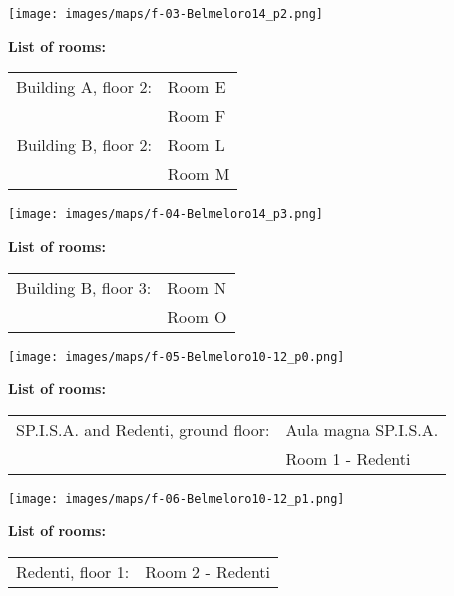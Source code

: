 \newpage
\hspace*{-1cm}
\texttt{[image: images/maps/f-03-Belmeloro14\_p2.png]}
\vfill

{\large\textbf{\hfill List of rooms:}\bigskip}

\hfill\colorbox{siamblue!50}{\large
\begin{tabular}{ r l }
  Building A, floor 2: & Room E \\
                       & Room F \\
  Building B, floor 2: & Room L \\
                       &Room M
\end{tabular}
}

\newpage
\hspace*{-1cm}
\texttt{[image: images/maps/f-04-Belmeloro14\_p3.png]}
\vfill

{\large\textbf{\hfill List of rooms:}\bigskip}

\hfill\colorbox{siamblue!50}{\large
\begin{tabular}{ r l }
  Building B, floor 3: & Room N \\
                       & Room O
\end{tabular}
}

\newpage
\hspace*{-1cm}
\texttt{[image: images/maps/f-05-Belmeloro10-12\_p0.png]}

{\large\textbf{\hfill List of rooms:}\bigskip}

\hfill\colorbox{siamblue!50}{\large
\begin{tabular}{ r l }
 SP.I.S.A. and Redenti, ground floor: & Aula magna SP.I.S.A. \\
                                      & Room 1 - Redenti
\end{tabular}
}

\vfill 

\hspace*{-1cm}
\texttt{[image: images/maps/f-06-Belmeloro10-12\_p1.png]}

{\large\textbf{\hfill List of rooms:}\bigskip}

\hfill\colorbox{siamblue!50}{\large
\begin{tabular}{ r l }
Redenti, floor 1: & Room 2 - Redenti
\end{tabular}
}


